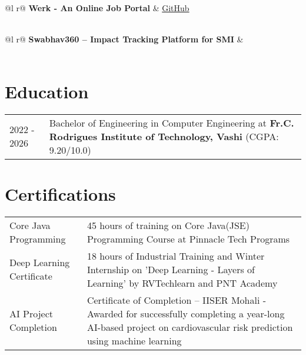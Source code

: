 \documentclass[a4paper,12pt]{article}
\begin{document}
\vspace{10pt}

\begin{tabularx}{\linewidth}{ @{}l r@{} }
\textbf{Werk - An Online Job Portal} & \hfill \href{https://github.com}{GitHub} \\[3.75pt]
  \\
\end{tabularx}

\vspace{10pt}

\begin{tabularx}{\linewidth}{ @{}l r@{} }
\textbf{Swabhav360 – Impact Tracking Platform for SMI} & \\[3.75pt]
  \\
\end{tabularx}

\section{Education}
\begin{tabularx}{\linewidth}{@{}l X@{}}	
2022 - 2026 & Bachelor of Engineering in Computer Engineering at \textbf{Fr.C. Rodrigues Institute of Technology, Vashi} \hfill \normalsize (CGPA: 9.20/10.0) \\
\end{tabularx}

\section{Certifications}
\begin{tabularx}{\linewidth}{@{}l X@{}}
Core Java Programming & 45 hours of training on Core Java(JSE) Programming Course at Pinnacle Tech Programs \\[3pt]
Deep Learning Certificate & 18 hours of Industrial Training and Winter Internship on 'Deep Learning - Layers of Learning' by RVTechlearn and PNT Academy \\[3pt]
AI Project Completion & Certificate of Completion – IISER Mohali - Awarded for successfully completing a year-long AI-based project on cardiovascular risk prediction using machine learning \\
\end{tabularx}
\end{document}

